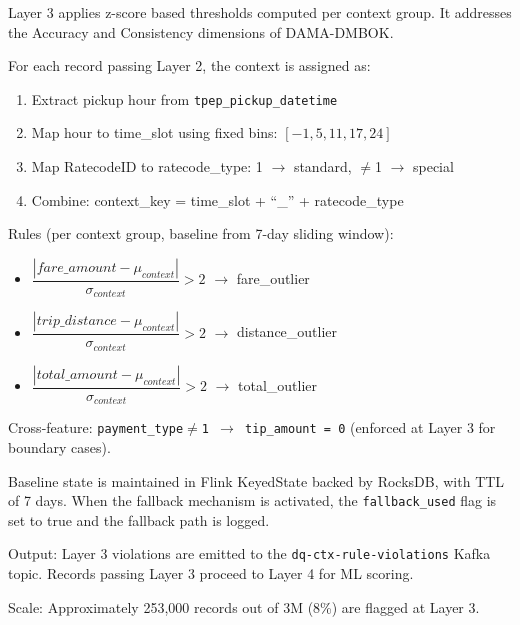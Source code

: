 Layer 3 applies z-score based thresholds computed per context group. It addresses the Accuracy and Consistency dimensions of DAMA-DMBOK.

For each record passing Layer 2, the context is assigned as:

\begin{enumerate}
    \item Extract pickup hour from \texttt{tpep\_pickup\_datetime}
    \item Map hour to time\_slot using fixed bins: $[-1, 5, 11, 17, 24]$
    \item Map RatecodeID to ratecode\_type: 1 $\to$ standard, $\neq$1 $\to$ special
    \item Combine: context\_key = time\_slot + ``\_{}'' + ratecode\_type
\end{enumerate}

Rules (per context group, baseline from 7-day sliding window):
\begin{itemize}
    \item $\dfrac{|fare\_amount - \mu_{context}|}{\sigma_{context}} > 2$ $\to$ fare\_outlier
    \item $\dfrac{|trip\_distance - \mu_{context}|}{\sigma_{context}} > 2$ $\to$ distance\_outlier
    \item $\dfrac{|total\_amount - \mu_{context}|}{\sigma_{context}} > 2$ $\to$ total\_outlier
\end{itemize}

Cross-feature: \texttt{payment\_type$\neq$1 $\to$ tip\_amount = 0} (enforced at Layer 3 for boundary cases).

Baseline state is maintained in Flink KeyedState backed by RocksDB, with TTL of 7 days. When the fallback mechanism is activated, the \texttt{fallback\_used} flag is set to true and the fallback path is logged.

Output: Layer 3 violations are emitted to the \texttt{dq-ctx-rule-violations} Kafka topic. Records passing Layer 3 proceed to Layer 4 for ML scoring.

Scale: Approximately 253,000 records out of 3M (8\%) are flagged at Layer 3.

